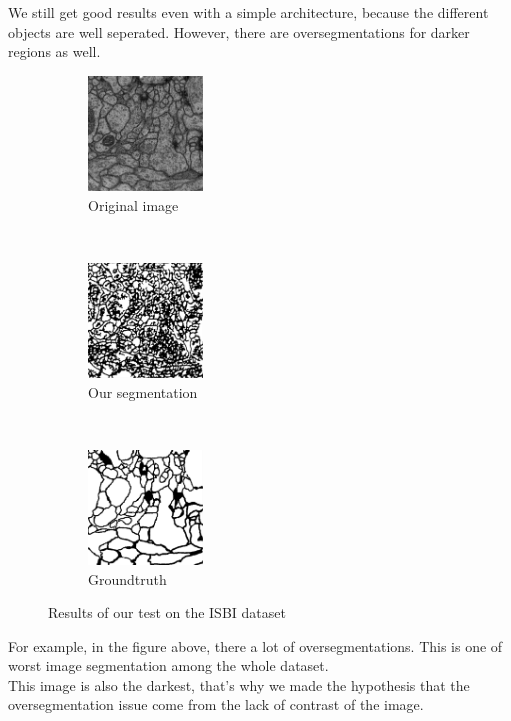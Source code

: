 We still get good results even with a simple architecture, because the different objects are well seperated.
However, there are oversegmentations for darker regions as well.

\begin{figure}[t!]
    \centering
    \begin{subfigure}[t]{0.5\textwidth}
        \centering
        \includegraphics[height=1.2in]{./images/isbi_orig_2.png}
        \caption{Original image}
    \end{subfigure}%
    ~ 
    \begin{subfigure}[t]{0.5\textwidth}
        \centering
        \includegraphics[height=1.2in]{./images/isbi_out_2.png}
        \caption{Our segmentation}
    \end{subfigure}
    ~ 
    \begin{subfigure}[t]{0.5\textwidth}
        \centering
        \includegraphics[height=1.2in]{./images/isbi_gt_2.png}
        \caption{Groundtruth}
    \end{subfigure}
    \caption{Results of our test on the ISBI dataset}
\end{figure}

For example, in the figure above, there a lot of oversegmentations. This is one of worst image segmentation among the whole dataset.\\
This image is also the darkest, that's why we made the hypothesis that the oversegmentation issue come from the lack of contrast of the image.\\

